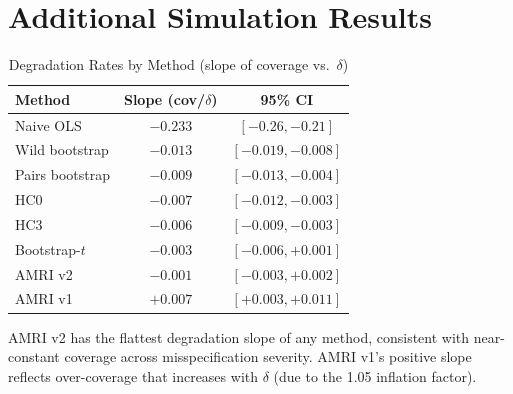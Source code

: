 \documentclass[12pt]{article}
\theoremstyle{definition}
\theoremstyle{remark}
\begin{document}
\section{Additional Simulation Results}\label{app:additional}

\begin{table}[H]
\centering
\caption{Degradation Rates by Method (slope of coverage vs.\ $\delta$)}
\label{tab:degradation}
\begin{tabular}{lcc}
\toprule
Method & Slope (cov/$\delta$) & 95\% CI \\
\midrule
Naive OLS & $-0.233$ & $[-0.26, -0.21]$ \\
Wild bootstrap & $-0.013$ & $[-0.019, -0.008]$ \\
Pairs bootstrap & $-0.009$ & $[-0.013, -0.004]$ \\
HC0 & $-0.007$ & $[-0.012, -0.003]$ \\
HC3 & $-0.006$ & $[-0.009, -0.003]$ \\
Bootstrap-$t$ & $-0.003$ & $[-0.006, +0.001]$ \\
AMRI v2 & $-0.001$ & $[-0.003, +0.002]$ \\
AMRI v1 & $+0.007$ & $[+0.003, +0.011]$ \\
\bottomrule
\end{tabular}
\end{table}

AMRI v2 has the flattest degradation slope of any method, consistent with near-constant coverage across misspecification severity. AMRI v1's positive slope reflects over-coverage that increases with $\delta$ (due to the 1.05 inflation factor).
\end{document}
